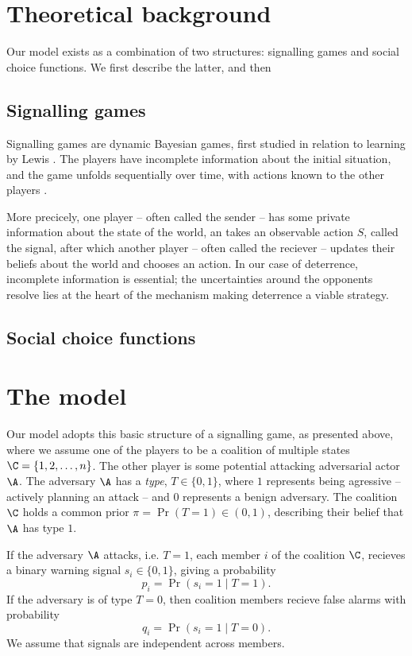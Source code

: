 

\section{Theoretical background}
Our model exists as a combination of two structures: signalling games and social choice functions. We first describe the latter, and then 


\subsection{Signalling games}
Signalling games are dynamic Bayesian games, first studied in relation to learning by Lewis \citeme. The players have incomplete information about the initial situation, and the game unfolds sequentially over time, with actions known to the other players \citeme. 

More precicely, one player -- often called the sender -- has some private information about the state of the world, an takes an observable action $S$, called the signal, after which another player -- often called the reciever -- updates their beliefs about the world and chooses an action. In our case of deterrence, incomplete information is essential; the uncertainties around the opponents resolve lies at the heart of the mechanism making deterrence a viable strategy. 

\subsection{Social choice functions}






\section{The model}

Our model adopts this basic structure of a signalling game, as presented above, where we assume one of the players to be a coalition of multiple states $\C = \{1, 2, \dots, n\}$. The other player is some potential attacking adversarial actor $\A$. The adversary $\A$ has a \emph{type}, $T \in \{0,1\}$, where $1$ represents being agressive -- actively planning an attack -- and $0$ represents a benign adversary. The coalition $\C$ holds a common prior $\pi = \Pr(T=1) \in (0,1)$, describing their belief that $\A$ has type $1$.

If the adversary $\A$ attacks, i.e. $T=1$, each member $i$ of the coalition $\C$, recieves a binary warning signal $s_i \in \{0,1\}$, giving a probability
\[p_i = \Pr(s_i = 1 \mid T=1).\]
If the adversary is of type $T=0$, then coalition members recieve false alarms with probability
\[q_i = \Pr(s_i = 1 \mid T=0).\]
We assume that signals are independent across members. 

